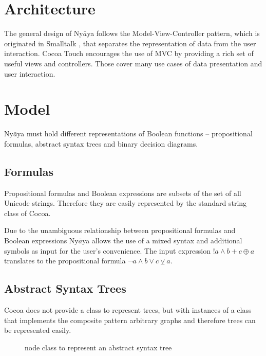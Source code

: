 
\section{Architecture}

The general design of Ny$\bar{a}$ya follows the Model-View-Controller pattern,
which is originated in Smalltalk \cite[p.4]{GAMMAETAL}, 
that separates the representation of data from the user interaction.
Cocoa Touch  encourages the use of MVC by providing a rich set of useful views and controllers.
Those cover many use cases of data presentation and user interaction.

\section{Model}

Ny$\bar{a}$ya must hold different representations of Boolean functions – propositional formulas, abstract syntax trees and binary decision diagrams. 

\subsection{Formulas}
Propositional formulas and Boolean expressions are subsets of the set of all Unicode strings. 
Therefore they are easily represented by the standard string class of Cocoa. 

Due to the unambiguous relationship between propositional formulas and Boolean expressions 
Ny$\bar{a}$ya allows the use of a mixed syntax and additional symbols as input
for the user's convenience. The input expression $!a \wedge b + c \oplus a$ translates to the propositional formula
$\neg a \wedge b \vee c \veebar a$.

\subsection{Abstract Syntax Trees}

Cocoa does not provide a class to represent trees, 
but with instances of a class that implements the composite pattern \cite[p.163ff]{GAMMAETAL}
arbitrary graphs and therefore trees can be represented easily.

\begin{figure}[htbp]
\begin{center}
\caption{node class to represent an abstract syntax tree}
\label{fig:NyayaNodeCluster}
\end{center}
\end{figure}


